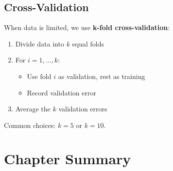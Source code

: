 \subsection{Cross-Validation}

When data is limited, we use \textbf{k-fold cross-validation}:

\begin{enumerate}
    \item Divide data into $k$ equal folds
    \item For $i = 1, \ldots, k$:
    \begin{itemize}
        \item Use fold $i$ as validation, rest as training
        \item Record validation error
    \end{itemize}
    \item Average the $k$ validation errors
\end{enumerate}

Common choices: $k = 5$ or $k = 10$.


\section{Chapter Summary}

